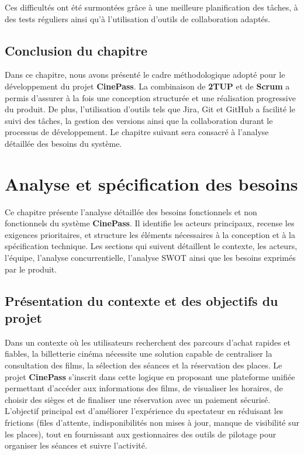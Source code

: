 \documentclass[12pt]{report}
\begin{document}
Ces difficultés ont été surmontées grâce à une meilleure planification des
tâches, à des tests réguliers ainsi qu’à l’utilisation d’outils de collaboration
adaptés.

\section{Conclusion du chapitre}

Dans ce chapitre, nous avons présenté le cadre méthodologique adopté pour le
développement du projet \textbf{CinePass}. La combinaison de \textbf{2TUP} et de
\textbf{Scrum} a permis d’assurer à la fois une conception structurée et une
réalisation progressive du produit. De plus, l’utilisation d’outils tels que
Jira, Git et GitHub a facilité le suivi des tâches, la gestion des versions ainsi
que la collaboration durant le processus de développement. Le chapitre suivant
sera consacré à l’analyse détaillée des besoins du système.
\chapter{Analyse et spécification des besoins}

Ce chapitre présente l'analyse détaillée des besoins fonctionnels et non fonctionnels du système \textbf{CinePass}. Il identifie les acteurs principaux, recense les exigences prioritaires, et structure les éléments nécessaires à la conception et à la spécification technique. Les sections qui suivent détaillent le contexte, les acteurs, l'équipe, l'analyse concurrentielle, l'analyse SWOT ainsi que les besoins exprimés par le produit.

\section{Présentation du contexte et des objectifs du projet}
Dans un contexte où les utilisateurs recherchent des parcours d'achat rapides et fiables, la billetterie cinéma nécessite une solution capable de centraliser la consultation des films, la sélection des séances et la réservation des places. Le projet \textbf{CinePass} s'inscrit dans cette logique en proposant une plateforme unifiée permettant d'accéder aux informations des films, de visualiser les horaires, de choisir des sièges et de finaliser une réservation avec un paiement sécurisé. L'objectif principal est d'améliorer l'expérience du spectateur en réduisant les frictions (files d'attente, indisponibilités non mises à jour, manque de visibilité sur les places), tout en fournissant aux gestionnaires des outils de pilotage pour organiser les séances et suivre l'activité.
\end{document}
